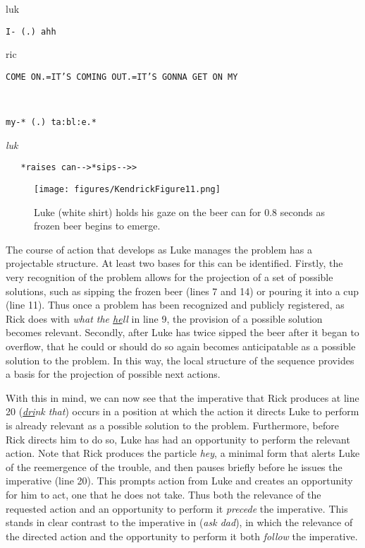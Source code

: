 \documentclass[output=paper,nonflat,modfont,draft]{langsci/langscibook}
\begin{document}
\begin{transbox}{22}{luk}
\begin{verbatim}
I- (.) ahh
\end{verbatim}
\end{transbox}

\begin{transbox}{23}{ric}
\begin{verbatim}
COME ON.=IT’S COMING OUT.=IT’S GONNA GET ON MY
\end{verbatim}
\end{transbox}

\begin{transbox}{24}{~}
\begin{verbatim}
my-* (.) ta:bl:e.*
\end{verbatim}
\end{transbox}

\begin{transbox}{25}{\textit{luk}}
\begin{verbatim}
   *raises can-->*sips-->>
\end{verbatim}
\end{transbox}\bigskip

\begin{figure}
\caption{Luke (white shirt) holds his gaze on the beer can for 0.8 seconds as frozen beer begins to emerge.}
\texttt{[image: figures/KendrickFigure11.png]}
\end{figure}

The course of action that develops as Luke manages the problem has a projectable structure. At least two bases for this can be identified. Firstly, the very recognition of the problem allows for the projection of a set of possible solutions, such as sipping the frozen beer (lines 7 and 14) or pouring it into a cup (line 11). Thus once a problem has been recognized and publicly registered, as Rick does with \textit{what the \uline{he}ll} in line 9, the provision of a possible solution becomes relevant. Secondly, after Luke has twice sipped the beer after it began to overflow, that he could or should do so again becomes anticipatable as a possible solution to the problem. In this way, the local structure of the sequence provides a basis for the projection of possible next actions.

\largerpage
With this in mind, we can now see that the imperative that Rick produces at line 20 (\textit{\uline{dri}nk that}) occurs in a position at which the action it directs Luke to perform is already relevant as a possible solution to the problem. Furthermore, before Rick directs him to do so, Luke has had an opportunity to perform the relevant action. Note that Rick produces the particle \textit{hey}, a minimal form that alerts Luke of the reemergence of the trouble, and then pauses briefly before he issues the imperative (line 20). This prompts action from Luke and creates an opportunity for him to act, one that he does not take. Thus both the relevance of the requested action and an opportunity to perform it \textit{precede} the imperative. This stands in clear contrast to the imperative in  (\textit{ask dad}), in which the relevance of the directed action and the opportunity to perform it both \textit{follow} the imperative.
\end{document}
